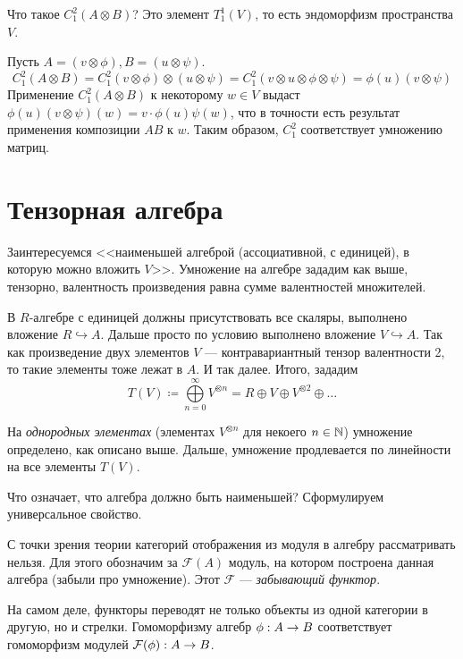 {{        Что такое $C_1^2(A \otimes B)$?
        Это элемент $T^1_1(V)$, то есть эндоморфизм пространства $V$.

        Пусть $A = (v\otimes \phi), B = (u \otimes \psi)$.
        \[C_1^2(A \otimes B) = C_1^2(v \otimes \phi) \otimes (u \otimes \psi) = C^2_1(v \otimes u \otimes \phi \otimes \psi) = \phi(u)(v \otimes \psi)\]
        Применение $C^2_1(A \otimes B)$ к некоторому $w \in V$ выдаст $\phi(u)(v \otimes \psi)(w) = v \cdot \phi(u)\psi(w)$, что в точности есть результат применения композиции $AB$ к $w$.
        Таким образом, $C^2_1$ соответствует умножению матриц.
    }
}


\section{Тензорная алгебра}
Заинтересуемся <<наименьшей алгеброй (ассоциативной, с единицей), в которую можно вложить $V$>>.
Умножение на алгебре зададим как выше, тензорно, валентность произведения равна сумме валентностей множителей.

В $R$-алгебре с единицей должны присутствовать все скаляры, выполнено вложение $R \hookrightarrow A$.
Дальше просто по условию выполнено вложение $V \hookrightarrow A$.
Так как произведение двух элементов $V$ --- контравариантный тензор валентности 2, то такие элементы тоже лежат в $A$.
И так далее.
Итого, зададим
\[T(V) \coloneqq \bigoplus\limits_{n = 0}^{\infty}V^{\otimes n} = R \oplus V \oplus V^{\otimes 2} \oplus \dots\]

На \emph{однородных элементах} (элементах $V^{\otimes n}$ для некоего $n \in \mathbb{N}$) умножение определено, как описано выше.
Дальше, умножение продлевается по линейности на все элементы $T(V)$.

Что означает, что алгебра должно быть наименьшей?
Сформулируем универсальное свойство.

С точки зрения теории категорий отображения из модуля в алгебру рассматривать нельзя.
Для этого обозначим за $\mathcal{F}(A)$ модуль, на котором построена данная алгебра (забыли про умножение).
Этот $\mathcal{F}$ --- \emph{забывающий функтор}.

На самом деле, функторы переводят не только объекты из одной категории в другую, но и стрелки.
Гомоморфизму алгебр $\phi: A \rightarrow B$ соответствует гомоморфизм модулей $\mathcal{F}(\phi): A \rightarrow B$.

